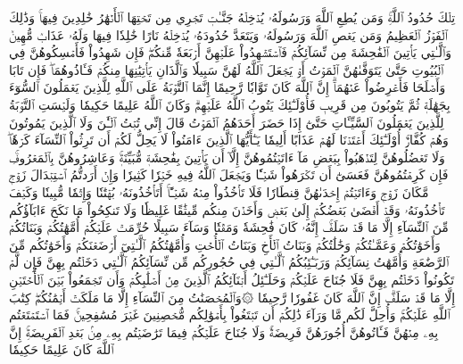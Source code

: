 تِلۡكَ حُدُودُ ٱللَّهِۚ وَمَن يُطِعِ ٱللَّهَ وَرَسُولَهُۥ يُدۡخِلۡهُ جَنَّـٰتٖ تَجۡرِي مِن تَحۡتِهَا ٱلۡأَنۡهَٰرُ خَٰلِدِينَ فِيهَاۚ وَذَٰلِكَ ٱلۡفَوۡزُ ٱلۡعَظِيمُ
وَمَن يَعۡصِ ٱللَّهَ وَرَسُولَهُۥ وَيَتَعَدَّ حُدُودَهُۥ يُدۡخِلۡهُ نَارًا خَٰلِدٗا فِيهَا وَلَهُۥ عَذَابٞ مُّهِينٞ
وَٱلَّـٰتِي يَأۡتِينَ ٱلۡفَٰحِشَةَ مِن نِّسَآئِكُمۡ فَٱسۡتَشۡهِدُواْ عَلَيۡهِنَّ أَرۡبَعَةٗ مِّنكُمۡۖ فَإِن شَهِدُواْ فَأَمۡسِكُوهُنَّ فِي ٱلۡبُيُوتِ حَتَّىٰ يَتَوَفَّىٰهُنَّ ٱلۡمَوۡتُ أَوۡ يَجۡعَلَ ٱللَّهُ لَهُنَّ سَبِيلٗا
وَٱلَّذَانِ يَأۡتِيَٰنِهَا مِنكُمۡ فَـَٔاذُوهُمَاۖ فَإِن تَابَا وَأَصۡلَحَا فَأَعۡرِضُواْ عَنۡهُمَآۗ إِنَّ ٱللَّهَ كَانَ تَوَّابٗا رَّحِيمًا
إِنَّمَا ٱلتَّوۡبَةُ عَلَى ٱللَّهِ لِلَّذِينَ يَعۡمَلُونَ ٱلسُّوٓءَ بِجَهَٰلَةٖ ثُمَّ يَتُوبُونَ مِن قَرِيبٖ فَأُوْلَـٰٓئِكَ يَتُوبُ ٱللَّهُ عَلَيۡهِمۡۗ وَكَانَ ٱللَّهُ عَلِيمًا حَكِيمٗا
وَلَيۡسَتِ ٱلتَّوۡبَةُ لِلَّذِينَ يَعۡمَلُونَ ٱلسَّيِّـَٔاتِ حَتَّىٰٓ إِذَا حَضَرَ أَحَدَهُمُ ٱلۡمَوۡتُ قَالَ إِنِّي تُبۡتُ ٱلۡـَٰٔنَ وَلَا ٱلَّذِينَ يَمُوتُونَ وَهُمۡ كُفَّارٌۚ أُوْلَـٰٓئِكَ أَعۡتَدۡنَا لَهُمۡ عَذَابًا أَلِيمٗا
يَـٰٓأَيُّهَا ٱلَّذِينَ ءَامَنُواْ لَا يَحِلُّ لَكُمۡ أَن تَرِثُواْ ٱلنِّسَآءَ كَرۡهٗاۖ وَلَا تَعۡضُلُوهُنَّ لِتَذۡهَبُواْ بِبَعۡضِ مَآ ءَاتَيۡتُمُوهُنَّ إِلَّآ أَن يَأۡتِينَ بِفَٰحِشَةٖ مُّبَيِّنَةٖۚ وَعَاشِرُوهُنَّ بِٱلۡمَعۡرُوفِۚ فَإِن كَرِهۡتُمُوهُنَّ فَعَسَىٰٓ أَن تَكۡرَهُواْ شَيۡـٔٗا وَيَجۡعَلَ ٱللَّهُ فِيهِ خَيۡرٗا كَثِيرٗا
وَإِنۡ أَرَدتُّمُ ٱسۡتِبۡدَالَ زَوۡجٖ مَّكَانَ زَوۡجٖ وَءَاتَيۡتُمۡ إِحۡدَىٰهُنَّ قِنطَارٗا فَلَا تَأۡخُذُواْ مِنۡهُ شَيۡـًٔاۚ أَتَأۡخُذُونَهُۥ بُهۡتَٰنٗا وَإِثۡمٗا مُّبِينٗا
وَكَيۡفَ تَأۡخُذُونَهُۥ وَقَدۡ أَفۡضَىٰ بَعۡضُكُمۡ إِلَىٰ بَعۡضٖ وَأَخَذۡنَ مِنكُم مِّيثَٰقًا غَلِيظٗا
وَلَا تَنكِحُواْ مَا نَكَحَ ءَابَآؤُكُم مِّنَ ٱلنِّسَآءِ إِلَّا مَا قَدۡ سَلَفَۚ إِنَّهُۥ كَانَ فَٰحِشَةٗ وَمَقۡتٗا وَسَآءَ سَبِيلًا
حُرِّمَتۡ عَلَيۡكُمۡ أُمَّهَٰتُكُمۡ وَبَنَاتُكُمۡ وَأَخَوَٰتُكُمۡ وَعَمَّـٰتُكُمۡ وَخَٰلَٰتُكُمۡ وَبَنَاتُ ٱلۡأَخِ وَبَنَاتُ ٱلۡأُخۡتِ وَأُمَّهَٰتُكُمُ ٱلَّـٰتِيٓ أَرۡضَعۡنَكُمۡ وَأَخَوَٰتُكُم مِّنَ ٱلرَّضَٰعَةِ وَأُمَّهَٰتُ نِسَآئِكُمۡ وَرَبَـٰٓئِبُكُمُ ٱلَّـٰتِي فِي حُجُورِكُم مِّن نِّسَآئِكُمُ ٱلَّـٰتِي دَخَلۡتُم بِهِنَّ فَإِن لَّمۡ تَكُونُواْ دَخَلۡتُم بِهِنَّ فَلَا جُنَاحَ عَلَيۡكُمۡ وَحَلَـٰٓئِلُ أَبۡنَآئِكُمُ ٱلَّذِينَ مِنۡ أَصۡلَٰبِكُمۡ وَأَن تَجۡمَعُواْ بَيۡنَ ٱلۡأُخۡتَيۡنِ إِلَّا مَا قَدۡ سَلَفَۗ إِنَّ ٱللَّهَ كَانَ غَفُورٗا رَّحِيمٗا
۞وَٱلۡمُحۡصَنَٰتُ مِنَ ٱلنِّسَآءِ إِلَّا مَا مَلَكَتۡ أَيۡمَٰنُكُمۡۖ كِتَٰبَ ٱللَّهِ عَلَيۡكُمۡۚ وَأُحِلَّ لَكُم مَّا وَرَآءَ ذَٰلِكُمۡ أَن تَبۡتَغُواْ بِأَمۡوَٰلِكُم مُّحۡصِنِينَ غَيۡرَ مُسَٰفِحِينَۚ فَمَا ٱسۡتَمۡتَعۡتُم بِهِۦ مِنۡهُنَّ فَـَٔاتُوهُنَّ أُجُورَهُنَّ فَرِيضَةٗۚ وَلَا جُنَاحَ عَلَيۡكُمۡ فِيمَا تَرَٰضَيۡتُم بِهِۦ مِنۢ بَعۡدِ ٱلۡفَرِيضَةِۚ إِنَّ ٱللَّهَ كَانَ عَلِيمًا حَكِيمٗا
